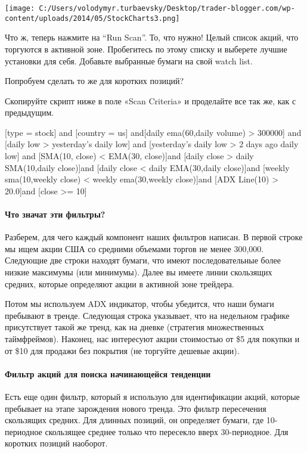 \documentclass[a5paper]{article}
\begin{document}
\texttt{[image: C:/Users/volodymyr.turbaevsky/Desktop/trader-blogger.com/wp-content/uploads/2014/05/StockCharts3.png]}

Что ж, теперь нажмите на “Run Scan”. То, что нужно! Целый список акций, что торгуются в активной зоне. Пробегитесь по этому списку и выберете лучшие установки для себя. Добавьте выбранные бумаги на свой watch list.

Попробуем сделать то же для коротких позиций?

Скопируйте скрипт ниже в поле «Scan Criteria» и проделайте все так же, как с предыдущим.

[type = stock] and [country = us] and[daily ema(60,daily volume) > 300000] and
[daily low > yesterday's daily low] and
[yesterday's daily low > 2 days ago daily low] and
[SMA(10, close) < EMA(30, close)]and
[daily close > daily SMA(10,daily close)]and
[daily close < daily EMA(30,daily close)]and
[weekly sma(10,weekly close) < weekly ema(30,weekly close)]and
[ADX Line(10) > 20.0]and
[close >= 10]

\paragraph{Что значат эти фильтры?}

Разберем, для чего каждый компонент наших фильтров написан. В первой строке мы ищем акции США со средними объемами торгов не менее 300,000. Следующие две строки находят бумаги, что имеют последовательные более низкие максимумы (или минимумы). Далее вы имеете линии скользящих средних, которые определяют акции в активной зоне трейдера.

Потом мы используем ADX индикатор, чтобы убедится, что наши бумаги
пребывают в тренде. Следующая строка указывает, что на недельном
графике присутствует такой же тренд, как на дневке (стратегия
множественных таймфреймов). Наконец, нас интересуют акции стоимостью
от \$5 для покупки и от \$10 для продажи без покрытия (не торгуйте
дешевые акции).

\paragraph{Фильтр акций для поиска начинающейся тенденции}

Есть еще один фильтр, который я использую для идентификации акций, которые пребывает на этапе зарождения нового тренда. Это фильтр пересечения скользящих средних. Для длинных позиций, он определяет бумаги, где 10-периодное скользящее среднее только что пересекло вверх 30-периодное. Для коротких позиций наоборот.
\end{document}

